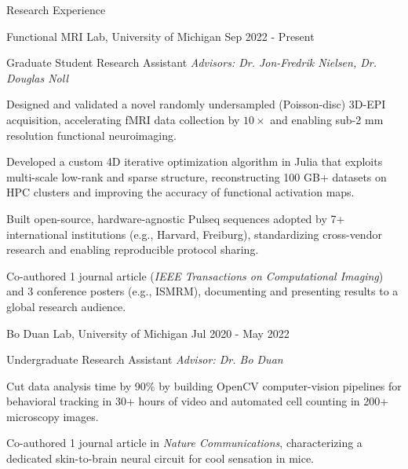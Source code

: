 \documentclass{resume}
\begin{document}
\begin{rSection}{Research Experience}
    \begin{rSubsection}{Functional MRI Lab}{, University of Michigan \hfill {Sep 2022 - Present}}
    	\item {Graduate Student Research Assistant \hfill \textit{Advisors: Dr. Jon-Fredrik Nielsen, Dr. Douglas Noll}}
    	\begin{rSubsubsection}
            \item Designed and validated a novel randomly undersampled (Poisson-disc) 3D-EPI acquisition, accelerating fMRI data collection by $10\times$ and enabling sub-2 mm resolution functional neuroimaging.
            \item Developed a custom 4D iterative optimization algorithm in Julia that exploits multi-scale low-rank and sparse structure, reconstructing 100 GB+ datasets on HPC clusters and improving the accuracy of functional activation maps.
            \item Built open-source, hardware-agnostic Pulseq sequences adopted by 7+ international institutions (e.g., Harvard, Freiburg), standardizing cross-vendor research and enabling reproducible protocol sharing.
            \item Co-authored 1 journal article (\textit{IEEE Transactions on Computational Imaging}) and 3 conference posters (e.g., ISMRM), documenting and presenting results to a global research audience.
    	\end{rSubsubsection}
	\end{rSubsection}

    \begin{rSubsection}{Bo Duan Lab}{, University of Michigan \hfill {Jul 2020 - May 2022}}
	\item {Undergraduate Research Assistant \hfill \textit{Advisor: Dr. Bo Duan}}
	\begin{rSubsubsection}
        \item Cut data analysis time by 90\% by building OpenCV computer-vision pipelines for behavioral tracking in 30+ hours of video and automated cell counting in 200+ microscopy images.
        \item Co-authored 1 journal article in \textit{Nature Communications}, characterizing a dedicated skin-to-brain neural circuit for cool sensation in mice.
	\end{rSubsubsection}
    \end{rSubsection}
\end{rSection}
\end{document}
